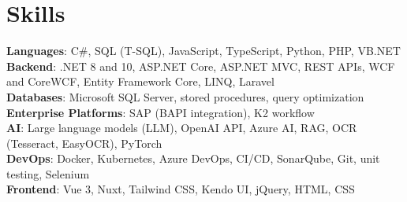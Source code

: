 \section{Skills}
\begin{itemize}[leftmargin=0.15in, label={}]
\small{\item{
    \textbf{Languages}{: C\#, SQL (T-SQL), JavaScript, TypeScript, Python, PHP, VB.NET} \\[2pt]
    \textbf{Backend}{: .NET 8 and 10, ASP.NET Core, ASP.NET MVC, REST APIs, WCF and CoreWCF, Entity Framework Core, LINQ, Laravel} \\[2pt]
    \textbf{Databases}{: Microsoft SQL Server, stored procedures, query optimization} \\[2pt]
    \textbf{Enterprise Platforms}{: SAP (BAPI integration), K2 workflow} \\[2pt]
    \textbf{AI}{: Large language models (LLM), OpenAI API, Azure AI, RAG, OCR (Tesseract, EasyOCR), PyTorch} \\[2pt]
    \textbf{DevOps}{: Docker, Kubernetes, Azure DevOps, CI/CD, SonarQube, Git, unit testing, Selenium} \\[2pt]
    \textbf{Frontend}{: Vue 3, Nuxt, Tailwind CSS, Kendo UI, jQuery, HTML, CSS}
}}
\end{itemize}